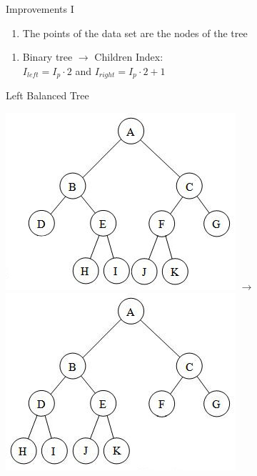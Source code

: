 \documentclass{beamer}
\newenvironment{changemargin}[2]{%
  \begin{list}{}{%
    \setlength{\topsep}{0pt}%
    \setlength{\leftmargin}{#1}%
    \setlength{\rightmargin}{#2}%
    \setlength{\listparindent}{\parindent}%
    \setlength{\itemindent}{\parindent}%
    \setlength{\parsep}{\parskip}%
  }%
  \item[]}{\end{list}}
\begin{document}
\begin{frame}{Improvements I}
\begin{enumerate}
\item [1.] The points of the data set are the nodes of the tree
\end{enumerate}

\begin{enumerate}
\item [2.] Binary tree $\rightarrow$ Children Index:\\ $I_{left} = I_p \cdot 2$ and $I_{right} = I_p \cdot 2 + 1$
\end{enumerate}

\begin{enumerate}
\item [3.] Left Balanced Tree \\
\begin{changemargin}{-3cm}{-2cm}
\begin{center}
\includegraphics[scale=0.5]{images/binary_tree2.jpg}
$\rightarrow$
\includegraphics[scale=0.5]{images/binary_tree2_lbt.jpg}
\end{center}
\end{changemargin}
\end{enumerate}
\end{frame}
\end{document}
